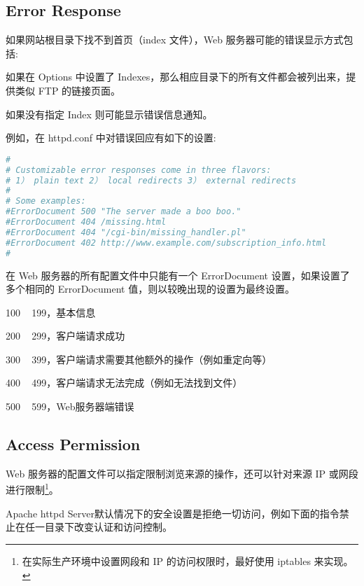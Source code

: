 \subsection{Error Response}

如果网站根目录下找不到首页（index 文件），Web 服务器可能的错误显示方式包括:

\begin{compactitem}
\item 如果在 Options 中设置了 Indexes，那么相应目录下的所有文件都会被列出来，提供类似 FTP 的链接页面。
\item 如果没有指定 Index 则可能显示错误信息通知。
\end{compactitem}

例如，在 httpd.conf 中对错误回应有如下的设置:


\begin{lstlisting}[language=bash]
#
# Customizable error responses come in three flavors:
# 1） plain text 2） local redirects 3） external redirects
#
# Some examples:
#ErrorDocument 500 "The server made a boo boo."
#ErrorDocument 404 /missing.html
#ErrorDocument 404 "/cgi-bin/missing_handler.pl"
#ErrorDocument 402 http://www.example.com/subscription_info.html
#
\end{lstlisting}


在 Web 服务器的所有配置文件中只能有一个 ErrorDocument 设置，如果设置了多个相同的 ErrorDocument 值，则以较晚出现的设置为最终设置。

\begin{compactitem}
\item 100 ~ 199，基本信息
\item 200 ~ 299，客户端请求成功
\item 300 ~ 399，客户端请求需要其他额外的操作（例如重定向等）
\item 400 ~ 499，客户端请求无法完成（例如无法找到文件）
\item 500 ~ 599，Web服务器端错误
\end{compactitem}

\subsection{Access Permission}

Web 服务器的配置文件可以指定限制浏览来源的操作，还可以针对来源 IP 或网段进行限制\footnote{在实际生产环境中设置网段和 IP 的访问权限时，最好使用 iptables 来实现。}。


Apache httpd Server默认情况下的安全设置是拒绝一切访问，例如下面的指令禁止在任一目录下改变认证和访问控制。

